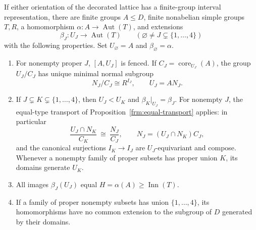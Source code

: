 \begin{proposition}
\label{ext:reduction}
If either orientation of the decorated lattice has a finite-group
interval representation, there are finite groups $A\le D$, finite
nonabelian simple groups $T,R$, a homomorphism
$\alpha:A\to\operatorname{Aut}(T)$, and extensions
\[
 \beta_J:U_J\to\operatorname{Aut}(T)
       \qquad(\varnothing\ne J\subsetneq\{1,\ldots,4\})
\]
with the following properties.  Set $U_\varnothing=A$ and
$\beta_\varnothing=\alpha$.
\begin{enumerate}[label=\textup{(E\arabic*)}]
\item\label{ext:e1}
For nonempty proper $J$, $[A,U_J]$ is fenced.  If
$C_J=\operatorname{core}_{U_J}(A)$, the group $U_J/C_J$ has unique
minimal normal subgroup
\[
 N_J/C_J\cong R^{I_J},\qquad U_J=AN_J.
\]
\item\label{ext:e2}
If $J\subsetneq K\subsetneq\{1,\ldots,4\}$, then $U_J<U_K$ and
$\beta_K|_{U_J}=\beta_J$.  For nonempty $J$, the equal-type transport
of Proposition~\ref{frm:equal-transport} applies: in particular
\[
 \frac{U_J\cap N_K}{C_K}\ \cong\ \frac{N_J}{C_J},
 \qquad N_J=(U_J\cap N_K)C_J,
\]
and the canonical surjections $I_K\to I_J$ are $U_J$-equivariant and compose.
Whenever a nonempty family of proper subsets has proper union $K$, its domains
generate $U_K$.
\item\label{ext:e3}
All images $\beta_J(U_J)$ equal
$H=\alpha(A)\ge\operatorname{Inn}(T)$.
\item\label{ext:e4}
If a family of proper nonempty subsets has union $\{1,\ldots,4\}$,
its homomorphisms have no common extension to the subgroup of $D$
generated by their domains.
\end{enumerate}
\end{proposition}
